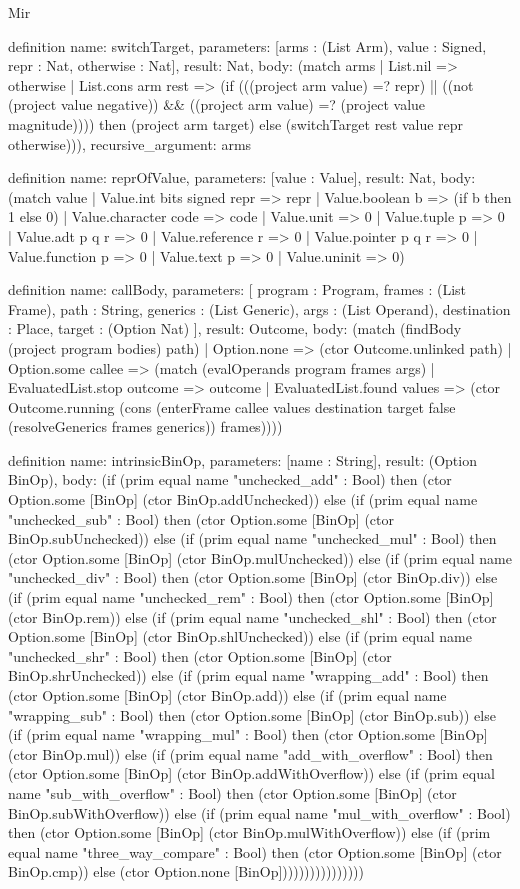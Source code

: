 \begin{lexlean}{Mir}
\begin{semanticmodule}
definition{
  name: switchTarget,
  parameters: [arms : (List Arm), value : Signed, repr : Nat, otherwise : Nat],
  result: Nat,
  body: (match arms
    | List.nil => otherwise
    | List.cons arm rest => (if (((project arm value) =? repr) || ((not (project value negative)) && ((project arm value) =? (project value magnitude)))) then (project arm target) else (switchTarget rest value repr otherwise))),
  recursive_argument: arms
}

definition{
  name: reprOfValue,
  parameters: [value : Value],
  result: Nat,
  body: (match value
    | Value.int bits signed repr => repr
    | Value.boolean b => (if b then 1 else 0)
    | Value.character code => code
    | Value.unit => 0
    | Value.tuple p => 0
    | Value.adt p q r => 0
    | Value.reference r => 0
    | Value.pointer p q r => 0
    | Value.function p => 0
    | Value.text p => 0
    | Value.uninit => 0)
}

definition{
  name: callBody,
  parameters: [
    program : Program,
    frames : (List Frame),
    path : String,
    generics : (List Generic),
    args : (List Operand),
    destination : Place,
    target : (Option Nat)
  ],
  result: Outcome,
  body: (match (findBody (project program bodies) path)
    | Option.none => (ctor Outcome.unlinked path)
    | Option.some callee => (match (evalOperands program frames args)
      | EvaluatedList.stop outcome => outcome
      | EvaluatedList.found values => (ctor Outcome.running (cons (enterFrame callee values destination target false (resolveGenerics frames generics)) frames))))
}

definition{
  name: intrinsicBinOp,
  parameters: [name : String],
  result: (Option BinOp),
  body: (if (prim equal name "unchecked_add" : Bool) then (ctor Option.some [BinOp] (ctor BinOp.addUnchecked)) else (if (prim equal name "unchecked_sub" : Bool) then (ctor Option.some [BinOp] (ctor BinOp.subUnchecked)) else (if (prim equal name "unchecked_mul" : Bool) then (ctor Option.some [BinOp] (ctor BinOp.mulUnchecked)) else (if (prim equal name "unchecked_div" : Bool) then (ctor Option.some [BinOp] (ctor BinOp.div)) else (if (prim equal name "unchecked_rem" : Bool) then (ctor Option.some [BinOp] (ctor BinOp.rem)) else (if (prim equal name "unchecked_shl" : Bool) then (ctor Option.some [BinOp] (ctor BinOp.shlUnchecked)) else (if (prim equal name "unchecked_shr" : Bool) then (ctor Option.some [BinOp] (ctor BinOp.shrUnchecked)) else (if (prim equal name "wrapping_add" : Bool) then (ctor Option.some [BinOp] (ctor BinOp.add)) else (if (prim equal name "wrapping_sub" : Bool) then (ctor Option.some [BinOp] (ctor BinOp.sub)) else (if (prim equal name "wrapping_mul" : Bool) then (ctor Option.some [BinOp] (ctor BinOp.mul)) else (if (prim equal name "add_with_overflow" : Bool) then (ctor Option.some [BinOp] (ctor BinOp.addWithOverflow)) else (if (prim equal name "sub_with_overflow" : Bool) then (ctor Option.some [BinOp] (ctor BinOp.subWithOverflow)) else (if (prim equal name "mul_with_overflow" : Bool) then (ctor Option.some [BinOp] (ctor BinOp.mulWithOverflow)) else (if (prim equal name "three_way_compare" : Bool) then (ctor Option.some [BinOp] (ctor BinOp.cmp)) else (ctor Option.none [BinOp])))))))))))))))
}


\end{semanticmodule}
\end{lexlean}
